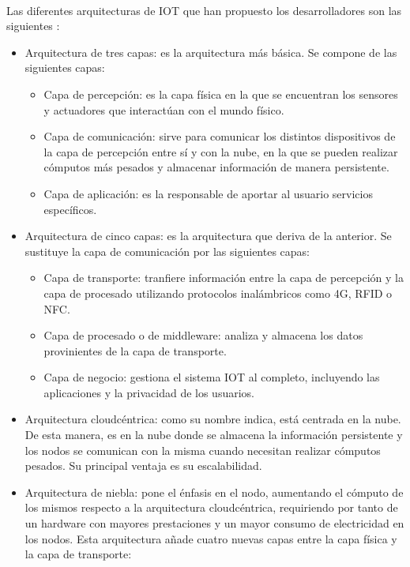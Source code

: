 \paragraph{}
Las diferentes arquitecturas de IOT que han propuesto los desarrolladores son las siguientes \citep{said2013towards, stojmenovic2014fog}:
\begin{itemize}
    \item Arquitectura de tres capas: es la arquitectura más básica. Se compone de las siguientes capas:
    \begin{itemize}
        \item Capa de percepción: es la capa física en la que se encuentran los sensores y actuadores que interactúan con el mundo físico.
        \item Capa de comunicación: sirve para comunicar los distintos dispositivos de la capa de percepción entre sí y con la nube, en la que se pueden realizar cómputos más pesados y almacenar información de manera persistente.
        \item Capa de aplicación: es la responsable de aportar al usuario servicios específicos.
    \end{itemize}
    \item Arquitectura de cinco capas: es la arquitectura que deriva de la anterior. Se sustituye la capa de comunicación por las siguientes capas:
    \begin{itemize}
        \item Capa de transporte: tranfiere información entre la capa de percepción y la capa de procesado utilizando protocolos inalámbricos como 4G, RFID o NFC.
        \item Capa de procesado o de middleware: analiza y almacena los datos provinientes de la capa de transporte.
        \item Capa de negocio: gestiona el sistema IOT al completo, incluyendo las aplicaciones y la privacidad de los usuarios.
    \end{itemize}
    \item Arquitectura cloudcéntrica: como su nombre indica, está centrada en la nube. De esta manera, es en la nube donde se almacena la información persistente y los nodos se comunican con la misma cuando necesitan realizar cómputos pesados. Su principal ventaja es su escalabilidad.
    \item Arquitectura de niebla: pone el énfasis en el nodo, aumentando el cómputo de los mismos respecto a la arquitectura cloudcéntrica, requiriendo por tanto de un hardware con mayores prestaciones y un mayor consumo de electricidad en los nodos. Esta arquitectura añade cuatro nuevas capas entre la capa física y la capa de transporte:

\end{itemize}
